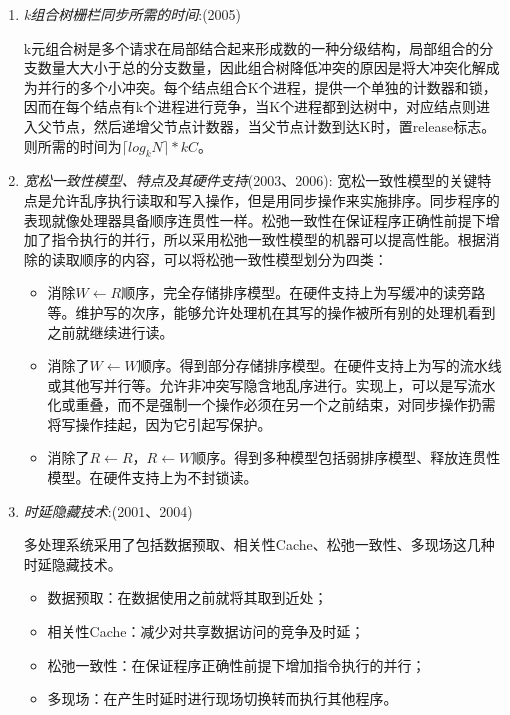 \documentclass[a4paper]{ctexart}
\begin{document}
\begin{enumerate}
  \item \emph{k组合树栅栏同步所需的时间}:(2005)
  
  k元组合树是多个请求在局部结合起来形成数的一种分级结构，局部组合的分支数量大大小于总的分支数量，因此组合树降低冲突的原因是将大冲突化解成为并行的多个小冲突。每个结点组合K个进程，提供一个单独的计数器和锁，因而在每个结点有k个进程进行竞争，当K个进程都到达树中，对应结点则进入父节点，然后递增父节点计数器，当父节点计数到达K时，置release标志。则所需的时间为$\lceil log_kN \rceil*kC$。
  
  \item \emph{宽松一致性模型、特点及其硬件支持}(2003、2006):
  宽松一致性模型的关键特点是允许乱序执行读取和写入操作，但是用同步操作来实施排序。同步程序的表现就像处理器具备顺序连贯性一样。松弛一致性在保证程序正确性前提下增加了指令执行的并行，所以采用松弛一致性模型的机器可以提高性能。根据消除的读取顺序的内容，可以将松弛一致性模型划分为四类：
  \begin{itemize}
    \item 消除$W\leftarrow R$顺序，完全存储排序模型。在硬件支持上为写缓冲的读旁路等。维护写的次序，能够允许处理机在其写的操作被所有别的处理机看到之前就继续进行读。
    \item 消除了$W\leftarrow W$顺序。得到部分存储排序模型。在硬件支持上为写的流水线或其他写并行等。允许非冲突写隐含地乱序进行。实现上，可以是写流水化或重叠，而不是强制一个操作必须在另一个之前结束，对同步操作扔需将写操作挂起，因为它引起写保护。
    \item 消除了$R\leftarrow R$，$R\leftarrow W$顺序。得到多种模型包括弱排序模型、释放连贯性模型。在硬件支持上为不封锁读。
  \end{itemize}
  
  \item \emph{时延隐藏技术}:(2001、2004)
  
  多处理系统采用了包括数据预取、相关性Cache、松弛一致性、多现场这几种时延隐藏技术。
  \begin{itemize}
    \item 数据预取：在数据使用之前就将其取到近处；
    \item 相关性Cache：减少对共享数据访问的竞争及时延；
    \item 松弛一致性：在保证程序正确性前提下增加指令执行的并行；
    \item 多现场：在产生时延时进行现场切换转而执行其他程序。
  \end{itemize}
  
\end{enumerate}
\end{document}
